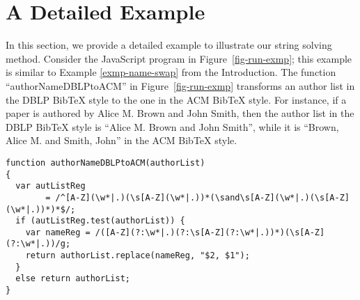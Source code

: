 
\section{A Detailed Example}\label{sec:mot}

In this section, we provide a detailed example to illustrate our string
solving method. 
Consider the JavaScript program in Figure~\ref{fig-run-exmp}; this example is
similar to Example \ref{exmp-name-swap} from the Introduction. The function ``authorNameDBLPtoACM'' in 
Figure~\ref{fig-run-exmp} transforms %
an author list in the DBLP BibTeX style to the one in the ACM BibTeX style. For instance,  if a paper is authored by Alice M. Brown and John Smith, then the author list in the DBLP BibTeX style is ``Alice M. Brown and John Smith'', while it is ``Brown, Alice M. and Smith, John'' in the ACM BibTeX style. 

\begin{figure*}[tb]
\begin{center}
\small
\begin{verbatim}
function authorNameDBLPtoACM(authorList)
{
  var autListReg 
	    = /^[A-Z](\w*|.)(\s[A-Z](\w*|.))*(\sand\s[A-Z](\w*|.)(\s[A-Z](\w*|.))*)*$/;
  if (autListReg.test(authorList)) {
    var nameReg = /([A-Z](?:\w*|.)(?:\s[A-Z](?:\w*|.))*)(\s[A-Z](?:\w*|.))/g;
    return authorList.replace(nameReg, "$2, $1");
  }
  else return authorList;
}
\end{verbatim}
\end{center}
\caption{Change the author list from the DBLP format to the ACM format\label{fig-run-exmp}}
\end{figure*}

 
